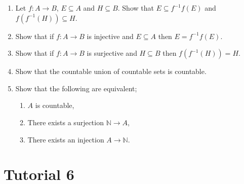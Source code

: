 \documentclass[12pt, reqno]{article}
\numberwithin{equation}{section}
\theoremstyle{definition}
\theoremstyle{remark}
\newcommand{\NN}{\mathbb{N}}
\begin{document}
\begin{enumerate}[leftmargin=*]
	\item Let $f:A\to B$, $E\subseteq A$ and $H\subseteq B$. Show that $E\subseteq f^{-1}f(E)$ and $f(f^{-1}(H))\subseteq H$.

	\item Show that if $f:A\to B$ is injective and $E\subseteq A$ then $E= f^{-1}f(E)$.

	\item Show that if $f:A\to B$ is surjective and $H\subseteq B$ then $f(f^{-1}(H)) = H$.

	\item Show that the countable union of countable sets is countable.

	\item Show that the following are equivalent;
	      \begin{enumerate}
		      \item $A$ is countable,
		      \item There exists a surjection $\NN\to A$,
		      \item There exists an injection $A\to \NN$.
	      \end{enumerate}

\end{enumerate}

\section*{Tutorial 6}
\end{document}
